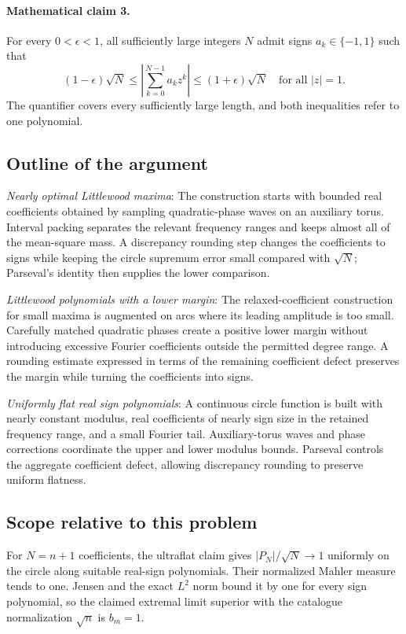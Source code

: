 \documentclass[11pt]{article}
\begin{document}
\paragraph{Mathematical claim 3.} For every $0<\epsilon<1$, all sufficiently large integers $N$ admit signs $a_k\in\{-1,1\}$ such that \[(1-\epsilon)\sqrt N\le\left|\sum_{k=0}^{N-1}a_kz^k\right|\le(1+\epsilon)\sqrt N\quad\text{for all }|z|=1.\] The quantifier covers every sufficiently large length, and both inequalities refer to one polynomial.

\subsection{Outline of the argument}
\textit{Nearly optimal Littlewood maxima}: The construction starts with bounded real coefficients obtained by sampling quadratic-phase waves on an auxiliary torus. Interval packing separates the relevant frequency ranges and keeps almost all of the mean-square mass. A discrepancy rounding step changes the coefficients to signs while keeping the circle supremum error small compared with $\sqrt N$; Parseval’s identity then supplies the lower comparison.

\textit{Littlewood polynomials with a lower margin}: The relaxed-coefficient construction for small maxima is augmented on arcs where its leading amplitude is too small. Carefully matched quadratic phases create a positive lower margin without introducing excessive Fourier coefficients outside the permitted degree range. A rounding estimate expressed in terms of the remaining coefficient defect preserves the margin while turning the coefficients into signs.

\textit{Uniformly flat real sign polynomials}: A continuous circle function is built with nearly constant modulus, real coefficients of nearly sign size in the retained frequency range, and a small Fourier tail. Auxiliary-torus waves and phase corrections coordinate the upper and lower modulus bounds. Parseval controls the aggregate coefficient defect, allowing discrepancy rounding to preserve uniform flatness.

\subsection{Scope relative to this problem}
For $N=n+1$ coefficients, the ultraflat claim gives $|P_N|/\sqrt N\to1$ uniformly on the circle along suitable real-sign polynomials. Their normalized Mahler measure tends to one. Jensen and the exact $L^2$ norm bound it by one for every sign polynomial, so the claimed extremal limit superior with the catalogue normalization $\sqrt n$ is $b_m=1$.
\end{document}
